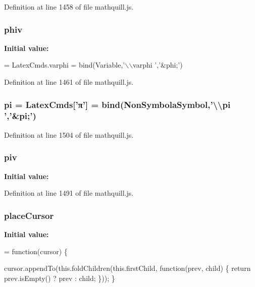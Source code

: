 Definition at line 1458 of file mathquill.\-js.

\subsubsection[{phiv}]{ phiv}\label{mathquill_8js_a8737fdf6793030fdab3cc30b669a77f3}
{\bfseries Initial value\-:}
\begin{DoxyCode}
= 
LatexCmds.varphi = 
  bind(Variable,\textcolor{stringliteral}{'\(\backslash\)\(\backslash\)varphi '},\textcolor{stringliteral}{'&phi;'})
\end{DoxyCode}


Definition at line 1461 of file mathquill.\-js.

\subsubsection[{pi}]{ pi = {\bf Latex\-Cmds}['π'] = {\bf bind}({\bf Non\-Symbola\-Symbol},'\textbackslash{}\textbackslash{}pi ','\&pi;')}\label{mathquill_8js_ab81358a4cdb09b754fe4363cc49a90b1}


Definition at line 1504 of file mathquill.\-js.

\subsubsection[{piv}]{ piv}\label{mathquill_8js_ad1ec5d7ddae4fa94ed218cf80f7ffa8b}
{\bfseries Initial value\-:}


Definition at line 1491 of file mathquill.\-js.

\subsubsection[{place\-Cursor}]{\setlength{\rightskip}{0pt plus 5cm}{\bf \-\_\-} place\-Cursor}\label{mathquill_8js_a47c0aff3395ecdf69853f9602b01cb54}
{\bfseries Initial value\-:}
\begin{DoxyCode}
= \textcolor{keyword}{function}(cursor) \{
  
  cursor.appendTo(this.foldChildren(this.firstChild, \textcolor{keyword}{function}(prev, child) \{
    \textcolor{keywordflow}{return} prev.isEmpty() ? prev : child;
  \}));
\}
\end{DoxyCode}


